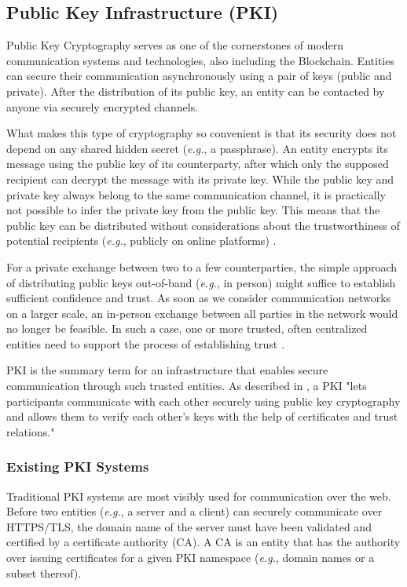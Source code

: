 \subsection{Public Key Infrastructure (PKI)}
\label{subsec:03_pki}

Public Key Cryptography serves as one of the cornerstones of modern communication systems and technologies, also including the Blockchain. Entities can secure their communication asynchronously using a pair of keys (public and private). After the distribution of its public key, an entity can be contacted by anyone via securely encrypted channels.

What makes this type of cryptography so convenient is that its security does not depend on any shared hidden secret (\textit{e.g.}, a passphrase). An entity encrypts its message using the public key of its counterparty, after which only the supposed recipient can decrypt the message with its private key. While the public key and private key always belong to the same communication channel, it is practically not possible to infer the private key from the public key. This means that the public key can be distributed without considerations about the trustworthiness of potential recipients (\textit{e.g.}, publicly on online platforms) \cite{straub_tobias_usability_2006}.

For a private exchange between two to a few counterparties, the simple approach of distributing public keys out-of-band (\textit{e.g.}, in person) might suffice to establish sufficient confidence and trust. As soon as we consider communication networks on a larger scale, an in-person exchange between all parties in the network would no longer be feasible. In such a case, one or more trusted, often centralized entities need to support the process of establishing trust \cite{straub_tobias_usability_2006}.

PKI is the summary term for an infrastructure that enables secure communication through such trusted entities. As described in \cite{straub_tobias_usability_2006}, a PKI "lets participants communicate with each other securely using public key cryptography and allows them to verify each other's keys with the help of certificates and trust relations."


\subsubsection{Existing PKI Systems}

Traditional PKI systems are most visibly used for communication over the web. Before two entities (\textit{e.g.}, a server and a client) can securely communicate over HTTPS/TLS, the domain name of the server must have been validated and certified by a certificate authority (CA). A CA is an entity that has the authority over issuing certificates for a given PKI namespace (\textit{e.g.}, domain names or a subset thereof).

